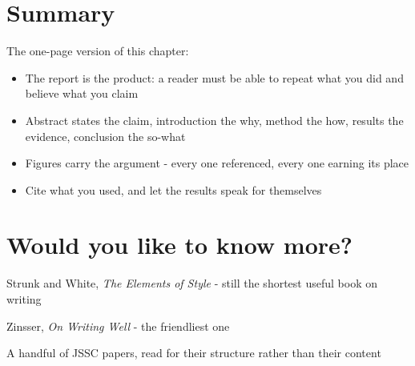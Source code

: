 \section{Summary}\label{summary}

The one-page version of this chapter:

\begin{itemize}
\tightlist
\item
  The report is the product: a reader must be able to repeat what you
  did and believe what you claim
\item
  Abstract states the claim, introduction the why, method the how,
  results the evidence, conclusion the so-what
\item
  Figures carry the argument - every one referenced, every one earning
  its place
\item
  Cite what you used, and let the results speak for themselves
\end{itemize}

\section{Would you like to know
more?}\label{would-you-like-to-know-more}

Strunk and White, \emph{The Elements of Style} - still the shortest
useful book on writing

Zinsser, \emph{On Writing Well} - the friendliest one

A handful of JSSC papers, read for their structure rather than their
content
